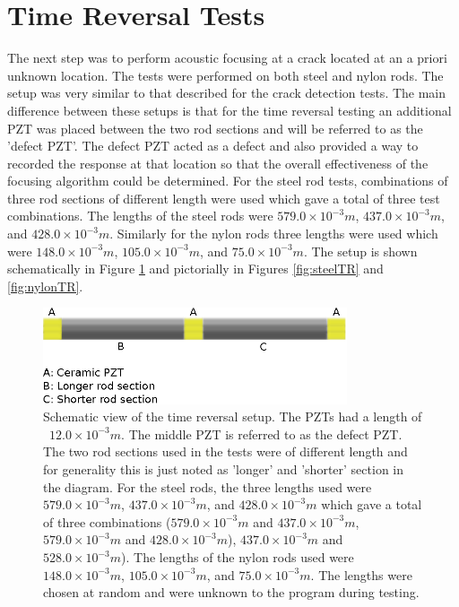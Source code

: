 \section{Time Reversal Tests}
The next step was to perform acoustic focusing at a crack located at an a priori unknown location. The tests were performed on both steel and nylon rods. The setup was very similar to that described for the crack detection tests. The main difference between these setups is that for the time reversal testing an additional PZT was placed between the two rod sections and will be referred to as the 'defect PZT'. The defect PZT acted as a defect and also provided a way to recorded the response at that location so that the overall effectiveness of the focusing algorithm could be determined. For the steel rod tests, combinations of three rod sections of different length were used which gave a total of three test combinations. The lengths of the steel rods were $579.0 \times 10^{-3} m$, $437.0 \times 10^{-3} m$, and $428.0 \times 10^{-3} m$. Similarly for the nylon rods three lengths were used which were $148.0 \times 10^{-3} m$, $105.0 \times 10^{-3} m$, and $75.0 \times 10^{-3} m$. The setup is shown schematically in Figure \ref{fig:tr_dimensions} and pictorially in Figures \ref{fig:steelTR} and \ref{fig:nylonTR}.

\begin{figure}[ht!]
\centering
\includegraphics[width=0.8\textwidth]{eps_pics/tr_dimensions}
\caption{Schematic view of the time reversal setup. The PZTs had a length of ~$12.0 \times 10^{-3}m$. The middle PZT is referred to as the defect PZT. The two rod sections used in the tests were of different length and for generality this is just noted as 'longer' and 'shorter' section in the diagram. For the steel rods, the three lengths used were $579.0 \times 10^{-3} m$, $437.0 \times 10^{-3} m$, and $428.0 \times 10^{-3} m$ which gave a total of three combinations ($579.0 \times 10^{-3} m$ and $437.0 \times 10^{-3} m$, $579.0 \times 10^{-3} m$ and $428.0 \times 10^{-3} m$), $437.0 \times 10^{-3} m$ and $528.0 \times 10^{-3} m$). The lengths of the nylon rods used were $148.0 \times 10^{-3} m$, $105.0 \times 10^{-3} m$, and $75.0 \times 10^{-3} m$. The lengths were chosen at random and were unknown to the program during testing.
 	 \label{fig:tr_dimensions}} 
\end{figure}

